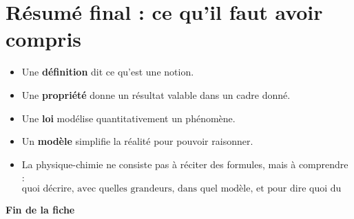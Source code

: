 \documentclass[11pt,a4paper]{article}
\begin{document}
\section{Résumé final : ce qu'il faut avoir compris}

\begin{itemize}
    \item Une \textbf{définition} dit ce qu'est une notion.
    \item Une \textbf{propriété} donne un résultat valable dans un cadre donné.
    \item Une \textbf{loi} modélise quantitativement un phénomène.
    \item Un \textbf{modèle} simplifie la réalité pour pouvoir raisonner.
    \item La physique-chimie ne consiste pas à réciter des formules, mais à comprendre :
    \[
    \text{quoi décrire, avec quelles grandeurs, dans quel modèle, et pour dire quoi du réel.}
    \]
\end{itemize}

\begin{center}
\Large \textbf{Fin de la fiche}
\end{center}
\end{document}
